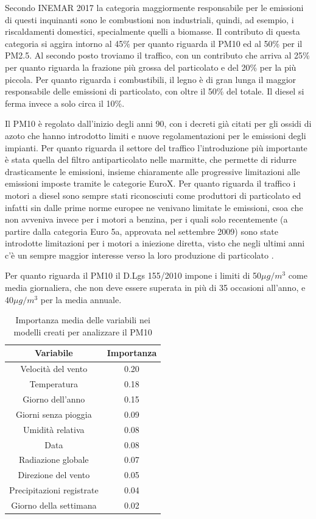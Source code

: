 Secondo INEMAR 2017 \cite{inemar2017}
 la categoria maggiormente responsabile per le emissioni di questi inquinanti sono le combustioni non industriali, quindi, ad esempio, i riscaldamenti domestici, specialmente quelli a biomasse. Il contributo di questa categoria si aggira intorno al 45\% per quanto riguarda il PM10 ed al 50\% per il PM2.5. Al secondo posto troviamo il traffico, con un contributo che arriva al 25\% per quanto riguarda la frazione più grossa del particolato e del 20\% per la più piccola. Per quanto riguarda i combustibili, il legno è di gran lunga il maggior responsabile delle emissioni di particolato, con oltre il 50\% del totale. Il diesel si ferma invece a solo circa il 10\%.

Il PM10 è regolato dall'inizio degli anni 90, con i decreti già citati per gli ossidi di azoto che hanno introdotto limiti e nuove regolamentazioni per le emissioni degli impianti. Per quanto riguarda il settore del traffico l'introduzione più importante è stata quella del filtro antiparticolato nelle marmitte, che permette di ridurre drasticamente le emissioni, insieme chiaramente alle progressive limitazioni alle emissioni imposte tramite le categorie EuroX. 
Per quanto riguarda il traffico i motori a diesel sono sempre stati riconosciuti come produttori di particolato ed infatti sin dalle prime norme europee ne venivano limitate le emissioni, csoa che non avveniva invece per i motori a benzina, per i quali solo recentemente (a partire dalla categoria Euro 5a, approvata nel settembre 2009) sono state introdotte limitazioni per i motori a iniezione diretta, visto che negli ultimi anni c'è un sempre maggior interesse verso la loro produzione di particolato  \cite{Raza_2018}. 

Per quanto riguarda il PM10 il D.Lgs 155/2010 impone i limiti di 50$\mu g/m^3$ come media giornaliera, che non deve essere superata in più di 35 occasioni all'anno, e 40$\mu g/m^3$ per la media annuale.

\begin{table}[h!]
\centering
\begin{tabular}{ |c c| }
	\hline
	Variabile & Importanza \\
	\hline
	Velocità del vento & 0.20 \\
	Temperatura & 0.18 \\
	Giorno dell'anno & 0.15 \\
	Giorni senza pioggia & 0.09 \\
	Umidità relativa & 0.08 \\
	Data & 0.08 \\
	Radiazione globale & 0.07 \\
	Direzione del vento & 0.05 \\
	Precipitazioni registrate & 0.04 \\
	Giorno della settimana & 0.02 \\
	\hline
\end{tabular}
\caption{Importanza media delle variabili nei modelli creati per analizzare il PM10}
\label{table:importanza_pm10}
\end{table}

